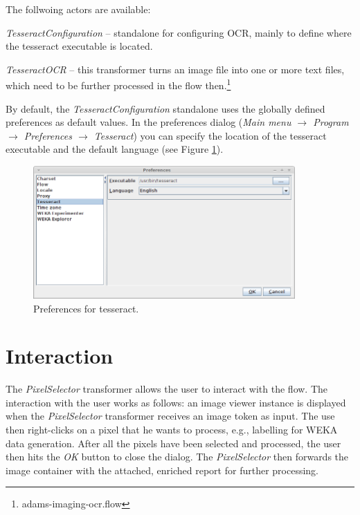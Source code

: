 \documentclass[a4paper]{book}
\begin{document}
The follwoing actors are available:
\begin{tight_itemize}
	\item \textit{TesseractConfiguration} -- standalone for configuring OCR, 
	mainly to define where the tesseract executable is located.
	\item \textit{TesseractOCR} -- this transformer turns an image file into
	one or more text files, which need to be further processed in the flow
	then.\footnote{adams-imaging-ocr.flow}
\end{tight_itemize}

By default, the \textit{TesseractConfiguration} standalone uses the globally
defined preferences as default values. In the preferences dialog 
(\textit{Main menu $\rightarrow$ Program $\rightarrow$ Preferences 
$\rightarrow$ Tesseract}) you can specify the location of the tesseract
executable and the default language (see Figure \ref{tesseract-preferences}).
\begin{figure}[htb]
  \centering
  \includegraphics[width=10.0cm]{images/tesseract-preferences.png}
  \caption{Preferences for tesseract.}
  \label{tesseract-preferences}
\end{figure}


\chapter{Interaction}
The \textit{PixelSelector} transformer allows the user to interact with the
flow. The interaction with the user works as follows: an image viewer instance
is displayed when the \textit{PixelSelector} transformer receives an image token
as input. The use then right-clicks on a pixel that he wants to process, e.g.,
labelling for WEKA data generation. After all the pixels have been selected and
processed, the user then hits the \textit{OK} button to close the dialog. The
\textit{PixelSelector} then forwards the image container with the
attached, enriched report for further processing.
\end{document}
